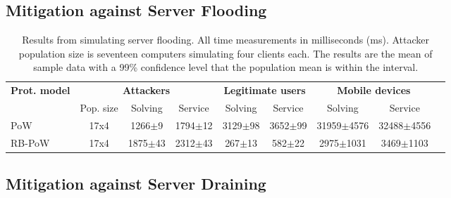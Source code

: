 \subsection{Mitigation against Server Flooding}
  \begin{table}[H]
    \centering
    \tiny
    \caption{Results from simulating server flooding. All time measurements in milliseconds (ms). Attacker population size is seventeen computers simulating four clients each. The results are the mean of sample data with a 99\% confidence level that the population mean is within the interval. }\label{tab:flooding}

    \begin{tabularx}{1.05\textwidth}{lcccccccr} \toprule
      \multicolumn{1}{c}{\textbf{Prot. model}} & \multicolumn{3}{c}{\textbf{Attackers}} & \multicolumn{2}{c}{\textbf{Legitimate users}} & \multicolumn{2}{c}{\textbf{Mobile devices}} \\
      \multicolumn{1}{c}{} & \multicolumn{1}{c}{Pop. size} & \multicolumn{1}{c}{Solving} & \multicolumn{1}{c}{Service} & \multicolumn{1}{c}{Solving} & \multicolumn{1}{c}{Service} & \multicolumn{1}{c}{Solving} & \multicolumn{1}{c}{Service}  \\ \toprule
      PoW & 17x4  & 1266$\pm$9 & 1794$\pm$12 & 3129$\pm$98 & 3652$\pm$99 & 31959$\pm$4576 & 32488$\pm$4556    \\
      RB-PoW & 17x4 & 1875$\pm$43 & 2312$\pm$43 & 267$\pm$13 & 582$\pm$22 & 2975$\pm$1031 & 3469$\pm$1103   \\ \bottomrule
    \end{tabularx}

  \end{table}


\subsection{Mitigation against Server Draining}

